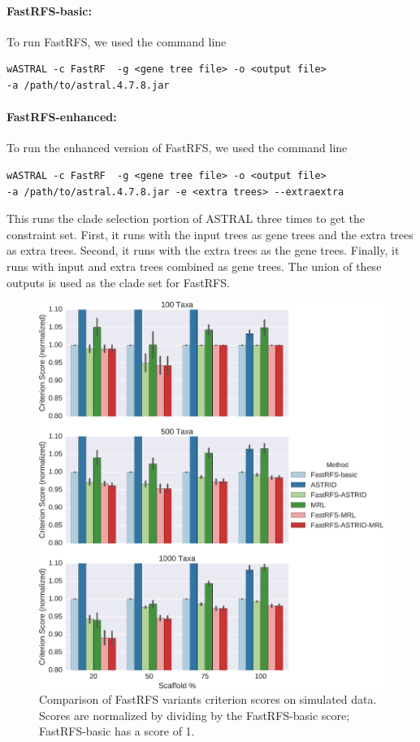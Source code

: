 \paragraph{FastRFS-basic: } 
To run FastRFS, we used the command line
\begin{verbatim}
wASTRAL -c FastRF  -g <gene tree file> -o <output file>
-a /path/to/astral.4.7.8.jar
\end{verbatim}

\paragraph{FastRFS-enhanced: }

To run the enhanced version of FastRFS, we used the
command line
\begin{verbatim}
wASTRAL -c FastRF  -g <gene tree file> -o <output file>
-a /path/to/astral.4.7.8.jar -e <extra trees> --extraextra
\end{verbatim}
This runs the clade selection portion of ASTRAL three times to get the
constraint set. First, it runs with the input trees as gene trees and
the extra trees as extra trees. Second, it runs with the extra trees
as the gene trees. Finally, it runs with input and extra trees
combined as gene trees. The union of these outputs is used as the
clade set for FastRFS.
\clearpage

 \begin{figure}
   \centering
   \includegraphics[width=\textwidth,height=0.6\textheight,keepaspectratio]{fastrfs-figs/smidgen-critscores-fastrfs-comparison.eps}  
   \caption{Comparison of FastRFS variants criterion scores on
     simulated data. Scores are normalized by dividing by the
     FastRFS-basic score; FastRFS-basic has a score of 1.}
   \label{fig:fastrfs-sup::sim-fastrfs-comp}
 \end{figure}


